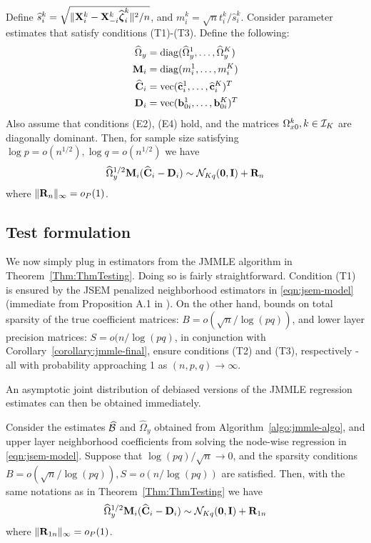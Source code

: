 \begin{theorem}\label{Thm:ThmTesting}
Define $\widehat s_i^k = \sqrt{\| {\mathbf{X}}_i^k - {\mathbf{X}}_{-i}^k \widehat {{\boldsymbol{\zeta}}}_i^k \|^2/n}$, and $m_i^k = \sqrt n t_i^k / \widehat s_i^k$. Consider parameter estimates that satisfy conditions (T1)-(T3). Define the following:
%
\begin{align*}
\widehat \Omega_y &= \operatorname*{diag}(\widehat \Omega_y^1, \ldots, \widehat \Omega_y^K)\\
{\mathbf{M}}_i &= \operatorname*{diag}(m_i^1, \ldots, m_i^K)\\
\widehat {{\mathbf{C}}}_i &= \operatorname*{vec}(\widehat {{\bf{c}}}_i^1, \ldots, \widehat {{\bf{c}}}_i^K)^T\\
{\mathbf{D}}_i &= \operatorname*{vec}({\bf{b}}_{0i}^1, \ldots, {\bf{b}}_{0i}^K)^T\\
\end{align*}
%
Also assume that conditions (E2), (E4) hold, and the matrices $\Omega_{x0}^k, k \in {\cal{I}}_K$ are diagonally dominant. Then, for sample size satisfying 
$\log p = o(n^{1/2}), \log q = o(n^{1/2})$ we have
%
\begin{align}\label{eqn:ThmTestingEqn}
\widehat \Omega_y^{1/2} {\mathbf{M}}_i (\widehat {{\mathbf{C}}}_i - {\mathbf{D}}_i) \sim
{\cal{N}}_{Kq} ({\bf 0}, {\mathbf{I}}) + {\mathbf{R}}_n
\end{align}
%
where $\| {\mathbf{R}}_n \|_\infty = o_P(1)$.
\end{theorem}
%

\subsection{Test formulation}
\label{sec:testing-subsec-2}
We now simply plug in estimators from the JMMLE algorithm in Theorem~\ref{Thm:ThmTesting}. Doing so is fairly straightforward. Condition (T1) is ensured by the JSEM penalized neighborhood estimators in \eqref{eqn:jsem-model} (immediate from Proposition A.1 in \citet{MaMichailidis15}). On the other hand, bounds on total sparsity of the true coefficient matrices: $B = o(\sqrt{n} / \log(pq))$, and lower layer precision matrices: $S = o( n/ \log (pq)$, in conjunction with Corollary~\ref{corollary:jmmle-final}, ensure conditions (T2) and (T3), respectively -all with probability approaching 1 as $(n,p,q) \rightarrow \infty$.

An asymptotic joint distribution of debiased versions of the JMMLE regression estimates can then be obtained immediately.
%
\begin{corollary}\label{corollary:CorTesting}
Consider the estimates $\widehat {{\cal{B}}}$ and $\widehat \Omega_y $ obtained from Algorithm~\ref{algo:jmmle-algo}, and upper layer neighborhood coefficients from solving the node-wise regression in \eqref{eqn:jsem-model}. Suppose that $\log (pq) /\sqrt n \rightarrow 0$, and the sparsity conditions $B = o(\sqrt{n} / \log(pq)), S = o( n / \log(pq))$ are satisfied. Then, with the same notations as in Theorem~\ref{Thm:ThmTesting} we have
%
\begin{align}\label{eqn:CorTestingEqn}
\widehat \Omega_y^{1/2} {\mathbf{M}}_i (\widehat {{\mathbf{C}}}_i - {\mathbf{D}}_i) \sim
{\cal{N}}_{Kq} ({\bf 0}, {\mathbf{I}}) + {\mathbf{R}}_{1n}
\end{align}
%
where $\| {\mathbf{R}}_{1n} \|_\infty = o_P(1)$.
\end{corollary}

